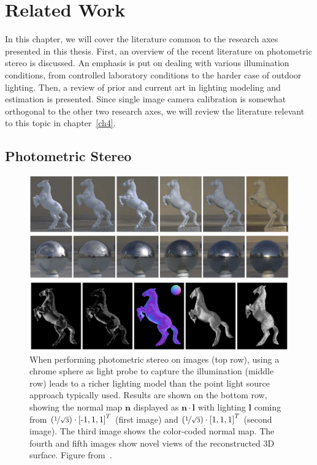 \chapter{Related Work}
\label{ch:rw}

In this chapter, we will cover the literature common to the research axes presented in this thesis. First, an overview of the recent literature on photometric stereo is discussed. An emphasis is put on dealing with various illumination conditions, from controlled laboratory conditions to the harder case of outdoor lighting. Then, a review of prior and current art in lighting modeling and estimation is presented. Since single image camera calibration is somewhat orthogonal to the other two research axes, we will review the literature relevant to this topic in chapter~\ref{ch4}.


\section{Photometric Stereo}


\begin{figure}
\centering
\includegraphics[width=0.96\linewidth]{3rdparty/yu-summary.png}
\caption[State-of-the-art calibrated photometric stereo]{When performing photometric stereo on images (top row), using a chrome sphere as light probe to capture the illumination (middle row) leads to a richer lighting model than the point light source approach typically used. Results are shown on the bottom row, showing the normal map $\mathbf{n}$ displayed as $\mathbf{n}\cdot\mathbf{l}$ with lighting $\mathbf{l}$ coming from $\left(\nicefrac{1}{\sqrt{3}}\right) \cdot \left[\text{-}1, 1, 1\right]^T$ (first image) and $\left( \nicefrac{1}{\sqrt{3}} \right) \cdot \left[1, 1, 1\right]^T$ (second image). The third image shows the color-coded normal map. The fourth and fifth images show novel views of the reconstructed 3D surface. Figure from~\cite{yu-iccp-13}.}
\label{fig:yu_summary}
\end{figure}

